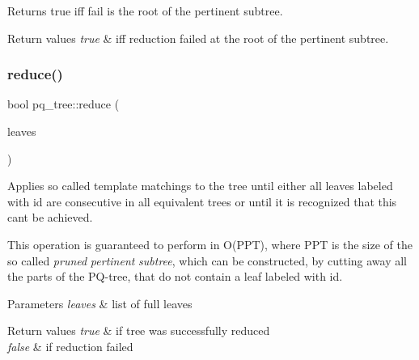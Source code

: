 Returns true iff fail is the root of the pertinent subtree. 


\begin{DoxyRetVals}{Return values}
{\em true} & iff reduction failed at the root of the pertinent subtree. \\
\hline
\end{DoxyRetVals}
\mbox{\label{classpq__tree_a89b995f33c70db329b5e0cdd2ebe12b0}} 
\subsubsection{\texorpdfstring{reduce()}{reduce()}}
{\footnotesize\ttfamily bool pq\+\_\+tree\+::reduce (\begin{DoxyParamCaption}\item[{list$<$ \mbox{\hyperlink{classpq__leaf}{pq\+\_\+leaf}} $\ast$$>$ \&}]{leaves }\end{DoxyParamCaption})}



Applies so called template matchings to the tree until either all leaves labeled with {\ttfamily id} are consecutive in all equivalent trees or until it is recognized that this can\textquotesingle{}t be achieved. 

This operation is guaranteed to perform in O(\+P\+P\+T), where P\+PT is the size of the so called {\itshape pruned} {\itshape pertinent} {\itshape subtree}, which can be constructed, by cutting away all the parts of the P\+Q-\/tree, that do not contain a leaf labeled with {\ttfamily id}.


\begin{DoxyParams}{Parameters}
{\em leaves} & list of full leaves\\
\hline
\end{DoxyParams}

\begin{DoxyRetVals}{Return values}
{\em true} & if tree was successfully reduced \\
\hline
{\em false} & if reduction failed \\
\hline
\end{DoxyRetVals}
\mbox{\label{classpq__tree_a68737f5cebd17670d9b73b797ca01a74}} 
